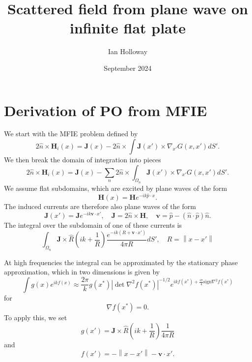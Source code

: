 \documentclass{article}
\title{Scattered field from plane wave on infinite flat plate}
\author{Ian Holloway}
\date{September 2024}
\newcommand{\norm}[1]{\left\lVert #1 \right\rVert}
\newcommand{\abs}[1]{\left\lvert #1 \right\rvert}
\theoremstyle{plain}
\begin{document}
\maketitle


\section{Derivation of PO from MFIE}

We start with the MFIE problem defined by
\begin{equation}
	2\hat{n}\times\mathbf{H}_i(x)
	= \mathbf{J}(x)
	- 2\hat{n}\times\int \mathbf{J}(x') \times \nabla_{x'} G(x,x') dS'.
\end{equation}
We then break the domain of integration into pieces
\begin{equation}
	2\hat{n}\times\mathbf{H}_i(x)
	= \mathbf{J}(x)
	- \sum_n 2\hat{n}\times\int_{\Omega_n} \mathbf{J}(x') \times \nabla_{x'} G(x,x') dS'.
\end{equation}
We assume flat subdomains, which are excited by plane waves of the form
\begin{equation}
	\mathbf{H}(x) = \mathbf{H}e^{-ik \hat{p} \cdot x}.
\end{equation}
The induced currents are therefore also plane waves of the form
\begin{equation}
	\mathbf{J}(x') = \mathbf{J}e^{-ik \mathbf{v} \cdot x'},
	\quad \mathbf{J} = 2\hat{n}\times\mathbf{H},
	\quad \mathbf{v} = \hat{p} - \left( \hat{n}\cdot\hat{p} \right)\hat{n}.
\end{equation}
The integral over the subdomain of one of these currents is
\begin{equation}
	\int_{\Omega_n}
	\mathbf{J} \times \hat{R}
	\left( ik + \frac{1}{R} \right)
	\frac{e^{-ik\left(R + \mathbf{v} \cdot x'\right)}}{4\pi R} dS',
	\quad R = \norm{x-x'}
\end{equation}



At high frequencies the integral can be approximated by the stationary phase approximation,
which in two dimensions is given by
\begin{equation}
	\int g(x) e^{ikf(x)}
	\approx \frac{2\pi}{k} g(x^*)
	\abs{\det \nabla^2 f(x^*)}^{-1/2}
	e^{ikf(x^*) + \frac{i\pi}{4}\text{sign}\nabla^2 f(x^*)}
\end{equation}
for
\begin{equation}
	\nabla f(x^*) = 0.
\end{equation}
To apply this, we set
\begin{equation}
	g(x') = 
	\mathbf{J} \times \hat{R}
	\left( ik + \frac{1}{R} \right)
	\frac{1}{4\pi R}
\end{equation}
and
\begin{equation}
	f(x') = -\norm{x-x'} - \mathbf{v}\cdot x'.
\end{equation}
\end{document}
